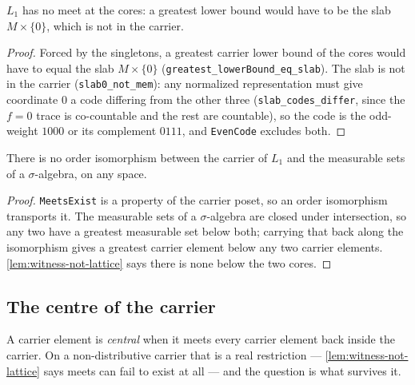 \begin{lemma}
\label{lem:witness-not-lattice}
\leanok
{}
$L_1$ has no meet at the cores: a greatest lower bound would have to be the
slab $M \times \{0\}$, which is not in the carrier.
\end{lemma}

\begin{proof}
\leanok
Forced by the singletons, a greatest carrier lower bound of the cores would have
to equal the slab $M \times \{0\}$ (\texttt{greatest\_lowerBound\_eq\_slab}).
The slab is not in the carrier (\texttt{slab0\_not\_mem}): any normalized
representation must give coordinate $0$ a code differing from the other three
(\texttt{slab\_codes\_differ}, since the $f = 0$ trace is co-countable and the
rest are countable), so the code is the odd-weight $1000$ or its complement
$0111$, and \texttt{EvenCode} excludes both.
\end{proof}
\begin{corollary}
  \label{cor:carrier-not-orderiso}
  \leanok
  There is no order isomorphism between the carrier of $L_1$ and the measurable
  sets of a $\sigma$-algebra, on any space.
\end{corollary}

\begin{proof}
  \leanok
  \texttt{MeetsExist} is a property of the carrier poset, so an order
  isomorphism transports it. The measurable sets of a $\sigma$-algebra are
  closed under intersection, so any two have a greatest measurable set below
  both; carrying that back along the isomorphism gives a greatest carrier
  element below any two carrier elements. \ref{lem:witness-not-lattice} says
  there is none below the two cores.
\end{proof}


\subsection{The centre of the carrier}

A carrier element is \emph{central} when it meets every carrier element back
inside the carrier. On a non-distributive carrier that is a real restriction ---
\ref{lem:witness-not-lattice} says meets can fail to exist at all --- and the
question is what survives it.

